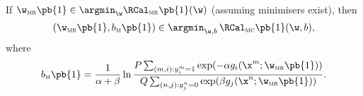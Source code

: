 \begin{theorem}
\label{theorem:mr2mc}
If $\w_\textsc{mr}\pb{1} \in \argmin_\w \RCal_\textsc{mr}\pb{1}(\w)$ (assuming minimisers exist),
then 
$$
(\w_\textsc{mr}\pb{1}, b_\textsc{m}\pb{1}) \in \argmin_{\w,b} \, \RCal_\textsc{mc}\pb{1}(\w, b),
$$ 
where
$$
b_\textsc{m}\pb{1} = \frac{1}{\alpha + \beta} \ln 
      \frac{P \sum_{(m,i): y_i^m = 1} \exp(-\alpha g_i(\x^m; \w_\textsc{mr}\pb{1}))}
           {Q \sum_{(n,j): y_j^n = 0} \exp( \beta  g_j(\x^n; \w_\textsc{mr}\pb{1}))}.
$$
\end{theorem}

